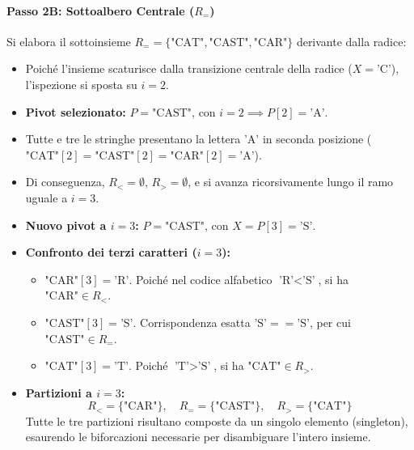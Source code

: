 \paragraph{Passo 2B: Sottoalbero Centrale ($R_{=}$)}
Si elabora il sottoinsieme $R_{=} = \{\text{"CAT"}, \text{"CAST"}, \text{"CAR"}\}$ derivante dalla radice:
\begin{itemize}
  \item Poich\'e l'insieme scaturisce dalla transizione centrale della radice ($X = \text{'C'}$), l'ispezione si sposta su \textbf{$i = 2$}.
  \item \textbf{Pivot selezionato:} $P = \text{"CAST"}$, con $i = 2 \implies P[2] = \text{'A'}$.
  \item Tutte e tre le stringhe presentano la lettera $\text{'A'}$ in seconda posizione ($\text{"CAT"}[2] = \text{"CAST"}[2] = \text{"CAR"}[2] = \text{'A'}$).
  \item Di conseguenza, $R_{<} = \emptyset$, $R_{>} = \emptyset$, e si avanza ricorsivamente lungo il ramo uguale a \textbf{$i = 3$}.
  \item \textbf{Nuovo pivot a $i = 3$:} $P = \text{"CAST"}$, con $X = P[3] = \text{'S'}$.
  \item \textbf{Confronto dei terzi caratteri ($i = 3$):}
  \begin{itemize}
    \item $\text{"CAR"}[3] = \text{'R'}$. Poich\'e nel codice alfabetico $\text{'R'} < \text{'S'}$, si ha $\text{"CAR"} \in R_{<}$.
    \item $\text{"CAST"}[3] = \text{'S'}$. Corrispondenza esatta $\text{'S'} == \text{'S'}$, per cui $\text{"CAST"} \in R_{=}$.
    \item $\text{"CAT"}[3] = \text{'T'}$. Poich\'e $\text{'T'} > \text{'S'}$, si ha $\text{"CAT"} \in R_{>}$.
  \end{itemize}
  \item \textbf{Partizioni a $i = 3$:}
  \begin{equation}
    R_{<} = \{\text{"CAR"}\}, \quad R_{=} = \{\text{"CAST"}\}, \quad R_{>} = \{\text{"CAT"}\}
  \end{equation}
  Tutte le tre partizioni risultano composte da un singolo elemento (singleton), esaurendo le biforcazioni necessarie per disambiguare l'intero insieme.
\end{itemize}

